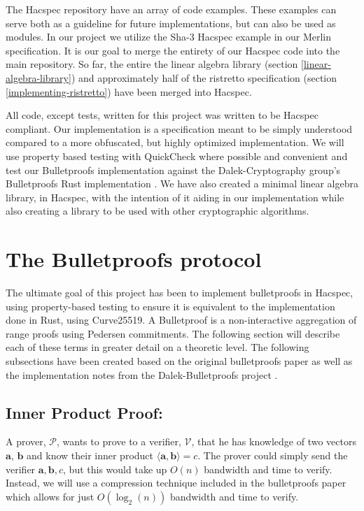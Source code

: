 \documentclass{article}
\renewcommand{\vec}[1]{\boldsymbol{#1}}
\newcommand{\V}{\mathcal{V}}
\renewcommand{\P}{\mathcal{P}}
\newcommand{\dotp}[2]{\langle #1, #2 \rangle}
\begin{document}
The Hacspec repository have an array of code examples. These examples
can serve both as a guideline for future implementations, but can also
be used as modules. In our project we utilize the Sha-3 Hacspec example
in our Merlin specification. It is our goal to merge the entirety
of our Hacspec code into the main repository. So far, the entire
the linear algebra library (section \ref{linear-algebra-library})
and approximately half of the ristretto specification (section
\ref{implementing-ristretto}) have been merged into Hacspec.

All code, except tests, written for this project was written to
be Hacspec compliant. Our implementation is a specification meant
to be simply understood compared to a more obfuscated, but highly
optimized implementation. We will use property based testing with
QuickCheck \cite{quickcheck} where possible and convenient and test
our Bulletproofs implementation against the Dalek-Cryptography group's
Bulletproofs Rust implementation \cite{dalek}. We have also created
a minimal linear algebra library, in Hacspec, with the intention of
it aiding in our implementation while also creating a library to be
used with other cryptographic algorithms.

\section{The Bulletproofs protocol} \label{bulletproofs}

The ultimate goal of this project has been to implement bulletproofs
in Hacspec, using property-based testing to ensure it is equivalent to
the implementation done in Rust, using Curve25519. A Bulletproof is a
non-interactive aggregation of range proofs using Pedersen commitments.
The following section will describe each of these terms in greater
detail on a theoretic level. The following subsections have been
created based on the original bulletproofs paper \cite{bulletproofs}
as well as the implementation notes from the Dalek-Bulletproofs project
\cite{dalek}.

\subsection{Inner Product Proof:} \label{inner-product-proof}
A prover, $\P$, wants to prove to a verifier, $\V$, that he has
knowledge of two vectors $\vec{a}$, $\vec{b}$ and know their inner
product $\dotp{\vec{a}}{\vec{b}} = c$. The prover could simply send
the verifier $\vec{a}, \vec{b}, c$, but this would take up $O(n)$
bandwidth and time to verify. Instead, we will use a compression
technique included in the bulletproofs paper which allows for just
$O(\log_2(n))$ bandwidth and time to verify.
\end{document}
